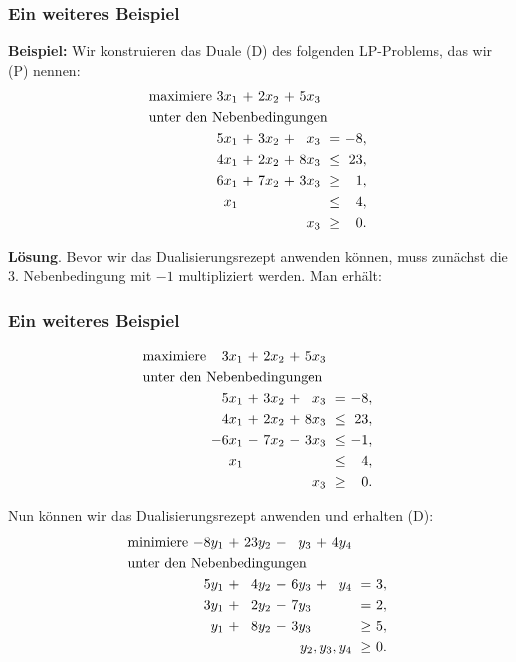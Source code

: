 \documentclass[smaller]{beamer}
\begin{document}
\begin{frame}
 \frametitle{Ein weiteres Beispiel}
 \textbf{Beispiel:} Wir konstruieren das Duale (D) des folgenden LP-Problems, das wir (P) nennen:
\begin{align*}
\begin{alignedat}{5}
& \text{maximiere } & 3x_1 &\ + &\ 2x_2 &\ + &\ 5x_3 & & \\
& \rlap{unter den Nebenbedingungen} & & & & & & & \\
&& 5x_1 &\ + &\ 3x_2 &\ + &\  x_3 &\    = &\ -8,\ \\
&& 4x_1 &\ + &\ 2x_2 &\ + &\ 8x_3 &\ \leq &\ 23,\ \\
&& 6x_1 &\ + &\ 7x_2 &\ + &\ 3x_3 &\ \geq &\  1,\ \\
&&  x_1 &\   &\      &\   &\      &\ \leq &\  4,\ \\
&& & & & & \llap{$x_3$} &\ \geq &\ 0. \
\end{alignedat}
\end{align*}

\textbf{Lösung}. Bevor wir das Dualisierungsrezept anwenden können, muss zunächst die 3. Nebenbedingung mit $-1$ multipliziert werden. Man erhält:
\end{frame}

\begin{frame}
 \frametitle{Ein weiteres Beispiel}
 \vspace*{-0.4cm}
 \begin{align*}
\begin{alignedat}{5}
& \text{maximiere } & 3x_1 &\ + &\ 2x_2 &\ + &\ 5x_3 & & \\
& \rlap{unter den Nebenbedingungen} & & & & & & & \\
&&  5x_1 &\ + &\ 3x_2 &\ + &\  x_3 &\    = &\ -8,\ \\
&&  4x_1 &\ + &\ 2x_2 &\ + &\ 8x_3 &\ \leq &\ 23,\ \\
&& -6x_1 &\ - &\ 7x_2 &\ - &\ 3x_3 &\ \leq &\ -1,\ \\
&&   x_1 &\   &\      &\   &\      &\ \leq &\  4,\ \\
&& & & & & \llap{$x_3$} &\ \geq &\ 0. \
\end{alignedat}
\end{align*}

Nun können wir das Dualisierungsrezept anwenden und erhalten (D):
\begin{align*}
\begin{alignedat}{6}
& \text{minimiere } & -8y_1 &\ + &\ 23y_2 &\ - &\ y_3 &\ + &\ 4y_4 & & \\
& \rlap{unter den Nebenbedingungen} & & & & & & & & & \\
&& 5y_1 &\ + &\ 4y_2 &\ - &\ 6y_3 &\ + &\ y_4 &\    = &\ 3,\ \\
&& 3y_1 &\ + &\ 2y_2 &\ - &\ 7y_3 &\   &\     &\    = &\ 2,\ \\
&&  y_1 &\ + &\ 8y_2 &\ - &\ 3y_3 &\   &\     &\ \geq &\ 5,\ \\
&& & & & & & & \llap{$y_2,y_3,y_4$} &\ \geq &\ 0. \
\end{alignedat}
\end{align*}
\end{frame}
\end{document}
